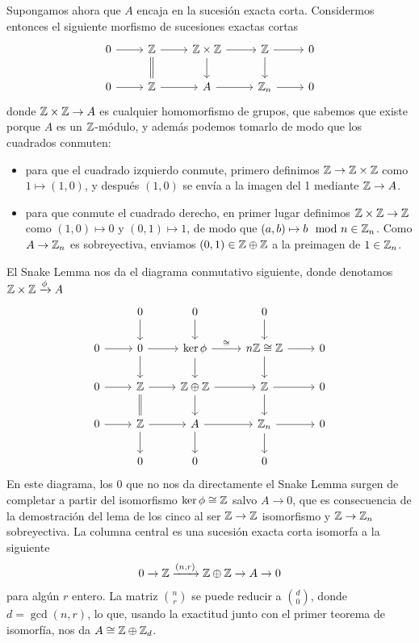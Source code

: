 \documentclass[twoside]{article}
\begin{document}
\begin{solucion}
    
Supongamos ahora que $A$ encaja en la sucesión exacta corta. Considermos entonces el siguiente morfismo de sucesiones exactas cortas
\[
\begin{tikzcd}
0\arrow[r] & \Z\arrow[r]\arrow[d, equals] &\Z\times\Z\arrow[r]\arrow[d] & \Z\arrow[r]\arrow[d] & 0\\
0\arrow[r] &  \Z\arrow[r] & A \arrow[r] & \Z_n\arrow[r] & 0
\end{tikzcd}
\]
donde $\mathbb{Z}\times\mathbb{Z}\to A$ es cualquier homomorfismo de grupos, que sabemos que existe porque $A$ es un $\mathbb{Z}$-módulo, y además podemos tomarlo de modo que los cuadrados conmuten: 
\begin{itemize}
\item para que el cuadrado izquierdo conmute, primero definimos $\mathbb{Z}\to\mathbb{Z}\times\mathbb{Z}$ como $1\mapsto (1,0)$, y después $(1,0)$ se envía a la imagen del 1 mediante $\mathbb{Z}\to A$.
\item para que conmute el cuadrado derecho, en primer lugar definimos $\mathbb{Z}\times\mathbb{Z}\to\mathbb{Z}$ como $(1,0)\mapsto 0$ y $(0,1)\mapsto 1$, de modo que $(a,b)\mapsto b\mod n\in\mathbb{Z}_n$. Como $A\to\mathbb{Z}_n$ es sobreyectiva, enviamos $(0,1)\in\mathbb{Z}\oplus\mathbb{Z}$ a la preimagen de $1\in\mathbb{Z}_n$.  
\end{itemize}
 El Snake Lemma nos da el diagrama conmutativo siguiente, donde denotamos $\mathbb{Z}\times\mathbb{Z}\xrightarrow{\phi} A$
\[
\begin{tikzcd}
            & 0\arrow[d] & 0\arrow[d]                  & 0\arrow[d] &\\
 0\arrow[r] & 0\arrow[r]\arrow[d] & \ker\phi\arrow[d] \arrow[r, "\cong"] & n\Z\cong\Z\arrow[r]\arrow[d] & 0\\
 0\arrow[r] & \Z\arrow[r]\arrow[d, equals] & \Z\oplus\Z \arrow[r]\arrow[d] & \Z \arrow[r]\arrow[d] & 0\\
 0\arrow[r] & \Z\arrow[r]\arrow[d] & A\arrow[r]\arrow[d] & \Z_n\arrow[r]\arrow[d] & 0\\
            &       0     &        0   &   0
\end{tikzcd}
\]
En este diagrama, los 0 que no nos da directamente el Snake Lemma surgen de completar a partir del isomorfismo $\ker\phi\cong\mathbb{Z}$ salvo $A\to 0$, que es consecuencia de la demostración del lema de los cinco al ser $\mathbb{Z}\to\mathbb{Z}$ isomorfismo y $\mathbb{Z}\to\mathbb{Z}_n$ sobreyectiva. La columna central es una sucesión exacta corta isomorfa a la siguiente
\[
0\to \mathbb{Z}\xrightarrow{(n,r)}\mathbb{Z}\oplus\mathbb{Z}\to A\to 0
\]
para algún $r$ entero. La matriz $\binom{n}{r}$ se puede reducir a $\binom{d}{0}$, donde $d=\gcd(n,r)$, lo que, usando la exactitud junto con el primer teorema de isomorfía, nos da $A\cong \mathbb{Z}\oplus\mathbb{Z}_d$.
\end{solucion}
\end{document}
